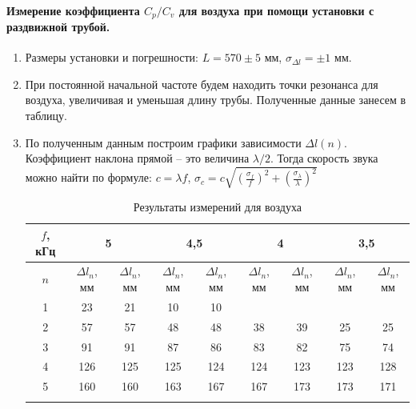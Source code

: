 \documentclass[a4paper, 12pt]{article}%
\begin{document}
	\paragraph { Измерение коэффициента $C_p / C_v $ для воздуха при помощи установки с раздвижной трубой.}
\begin{enumerate}
	\item Размеры установки и погрешности: $L  = 570 \pm 5$ мм, $\sigma_{\Delta l} =\pm 1$ мм.
	\item При постоянной начальной частоте будем находить точки резонанса для воздуха, увеличивая и уменьшая длину трубы. Полученные данные занесем в таблицу.
	\item По полученным данным построим графики зависимости $\Delta l (n)$. Коэффициент наклона прямой -- это величина $\lambda/2$. Тогда скорость звука можно найти по формуле: $c = \lambda f$, $\sigma_c=c\sqrt{(\frac{\sigma_f}{f})^2+(\frac{\sigma_{\lambda}}{\lambda})^2}$
	\newpage
	\begin{longtable}{|c|c|c|c|c|c|c|c|c|}
		\hline
		$ f $, кГц & \multicolumn{2}{c|}{\textbf{5}} & \multicolumn{2}{c|}{\textbf{4,5}} & \multicolumn{2}{c|}{\textbf{4}} & \multicolumn{2}{c|}{\textbf{3,5}} \\ \hline
		$ n $ & $\Delta l_n $, мм & $ \Delta l_n $, мм & $ \Delta l_n $, мм & $ \Delta l_n $, мм & $ \Delta l_n $, мм & $ \Delta l_n $, мм & $ \Delta l_n $, мм & $ \Delta l_n $, мм  \\ \hline
		1 & 23 & 21 & 10 & 10 &  &  &  &   \\ \hline
		2 & 57 & 57 & 48 & 48 & 38 & 39 & 25 & 25 \\ \hline
		3 & 91 & 91 & 87 & 86 & 83 & 82 & 75 & 74  \\ \hline
		4 & 126 & 125 & 125 & 124 & 124 & 123 & 123 & 128 \\ \hline
		5 & 160 & 160 & 163 & 167 & 167 & 173 & 173 & 171  \\ \hline
		\caption{Результаты измерений для воздуха}
	\end{longtable}
	
		\begin{figure}[h]
		\caption{}
	    \end{figure}
    

\end{enumerate}
\end{document}
